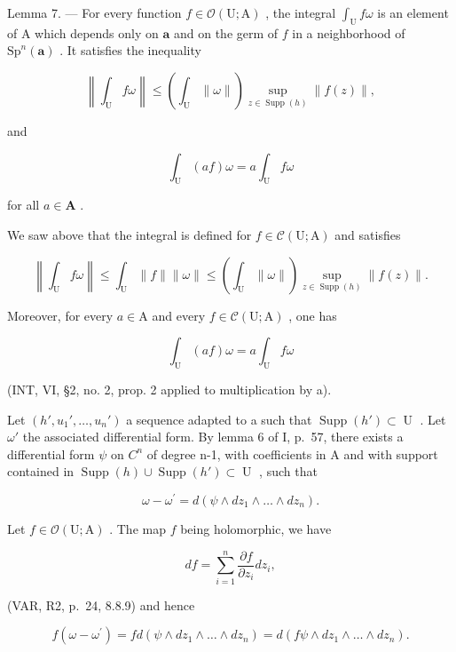 Lemma 7. --- For every function \(f \in \mathcal{O}(\mathrm{U};\mathrm{A})\) , the integral \(\int_{\mathrm{U}} f\omega\) is an element of A which depends only on \(\boldsymbol{a}\) and on the germ of \(f\) in a neighborhood of \(\mathrm{Sp}^{n}(\boldsymbol{a})\) . It satisfies the inequality

\[
\left\| \int_ {\mathrm{U}} f \omega \right\| \leqslant \left(\int_ {\mathrm{U}} \| \omega \|\right) \sup _ {z \in \operatorname{Supp} (h)} \| f (z) \|,\tag{4}
\]

and

\[
\int_ {\mathrm{U}} (a f) \omega = a \int_ {\mathrm{U}} f \omega
\]

for all \(a \in \mathbf{A}\) .

We saw above that the integral is defined for \(f \in \mathcal{C}(\mathrm{U};\mathrm{A})\) and satisfies

\[
\left\| \int_ {\mathrm{U}} f \omega \right\| \leqslant \int_ {\mathrm{U}} \| f \| \| \omega \| \leqslant \left(\int_ {\mathrm{U}} \| \omega \|\right) \sup _ {z \in \operatorname{Supp} (h)} \| f (z) \|.
\]

Moreover, for every \(a \in \mathrm{A}\) and every \(f \in \mathcal{C}(\mathrm{U};\mathrm{A})\) , one has

\[
\int_ {\mathrm{U}} (a f) \omega = a \int_ {\mathrm{U}} f \omega
\]

(INT, VI, §2, no. 2, prop. 2 applied to multiplication by a).

Let \((h', u_{1}', \ldots, u_{n}')\) a sequence adapted to a such that \(\operatorname{Supp}(h') \subset \operatorname{U}\) . Let \(\omega'\) the associated differential form. By lemma 6 of I, p.~57, there exists a differential form \(\psi\) on \(C^{n}\) of degree n-1, with coefficients in A and with support contained in \(\operatorname{Supp}(h) \cup \operatorname{Supp}(h') \subset \operatorname{U}\) , such that

\[
\omega - \omega^ {\prime} = d (\psi \wedge d z _ {1} \wedge \dots \wedge d z _ {n}).
\]

Let \(f \in \mathcal{O}(\mathrm{U};\mathrm{A})\) . The map \(f\) being holomorphic, we have

\[
d f = \sum_ {i = 1} ^ {n} \frac {\partial f}{\partial z _ {i}} d z _ {i},
\]

(VAR, R2, p.~24, 8.8.9) and hence

\[
f \left(\omega - \omega^ {\prime}\right) = f d \left(\psi \wedge d z _ {1} \wedge \dots \wedge d z _ {n}\right) = d \left(f \psi \wedge d z _ {1} \wedge \dots \wedge d z _ {n}\right).
\]

